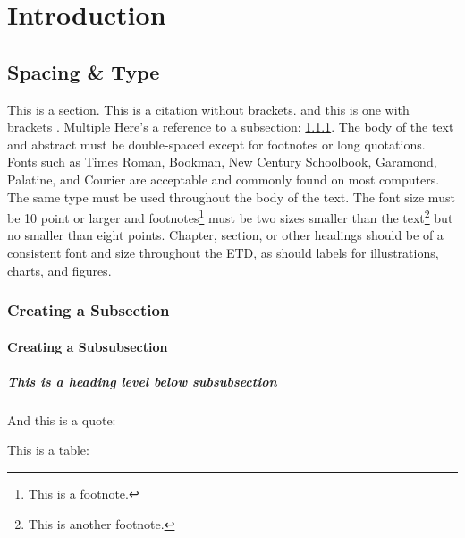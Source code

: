 \chapter{Introduction}
\label{chap:intro}
\section{Spacing \& Type}
\label{sec:section}

This is a section. This is a citation without brackets. and this is one with brackets \cite{A}. Multiple \cite{A,B,C} Here's a reference to a subsection: \ref{sec:subsection}. The body of the text and abstract must be double-spaced except for footnotes or long quotations. Fonts such as Times Roman, Bookman, New Century Schoolbook, Garamond, Palatine, and Courier are acceptable and commonly found on most computers. The same type must be used throughout the body of the text. The font size must be 10 point or larger and footnotes\footnote{This is a footnote.} must be two sizes smaller than the text\footnote{This is another footnote.} but no smaller than eight points. Chapter, section, or other headings should be of a consistent font and size throughout the ETD, as should labels for illustrations, charts, and figures.  

\subsection{Creating a Subsection}
\label{sec:subsection}

\subsubsection{Creating a Subsubsection}

\paragraph{This is a heading level below subsubsection}

And this is a quote: 
%
\begin{quote}
\blindtext
\end{quote}

This is a table:
\makeatletter
\let\@currsize\normalsize
\makeatother


